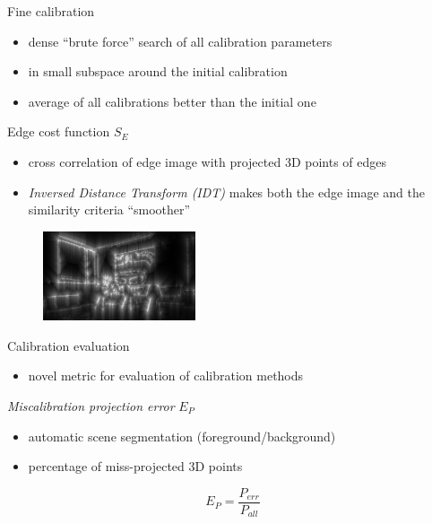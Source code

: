 \documentclass[pdf]{beamer}
\begin{document}
	\begin{frame}{Fine calibration}

		\begin{itemize}
			\item dense ``brute force'' search of all calibration parameters
			\item in small subspace around the initial calibration 
			\item average of all calibrations better than the initial one
		\end{itemize}

		\begin{block}{Edge cost function $S_E$}
			\begin{itemize}
				\item cross correlation of edge image with projected $3$D points of edges
				\item \emph{Inversed Distance Transform (IDT)} makes both the edge image and the similarity criteria ``smoother''
			\end{itemize}
		\end{block}

		\begin{figure}[h]
			\center
			\includegraphics[width=0.4\textwidth]{fig/edges_idt.png}
		\end{figure}

	\end{frame}	

	\begin{frame}{Calibration evaluation}
		\begin{itemize}
			\item novel metric for evaluation of calibration methods
		\end{itemize}
		
		\begin{block}{\emph{Miscalibration projection error} $E_P$}
			\begin{itemize}
				\item automatic scene segmentation (foreground/background)
				\item percentage of miss-projected $3$D points
			\end{itemize}
		\end{block}
		
		\begin{equation}
			E_P = \dfrac{P_{err}}{P_{all}}
		\end{equation}
	\end{frame}
	
\end{document}
